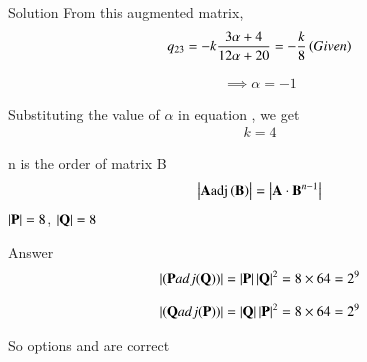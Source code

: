 \documentclass{beamer}
\begin{document}
\begin{frame}{Solution}
From this augmented matrix,
\begin{align}
q_{23} = -k\frac{3\alpha+4}{12\alpha+20} = -\frac{k}{8} \left(Given\right)
\end{align}

\begin{align}
\implies \alpha = -1
\end{align}


Substituting the value of $\alpha$ in equation , we get
\begin{align}
k = 4
\end{align}

n is the order of matrix B
\begin{align}
\left\vert{\mathbf{A}\mathrm{adj}\ensuremath{\left(\mathbf{B}\right)}}\right\vert = \left\vert\mathbf{A}\cdot\mathbf{B}^{n-1}\right\vert
\end{align}
$\left\vert\mathbf{P}\right\vert = 8$, $\left\vert\mathbf{Q}\right\vert = 8$
    
\end{frame}

\begin{frame}{Answer}
\begin{align}
\left\vert{(\mathbf{P} adj(\mathbf{Q}))}\right\vert = \left\vert\mathbf{P}\right\vert \left\vert\mathbf{Q}\right\vert^{2} = 8\times64 = 2^9
\end{align}

\begin{align}
\left\vert{(\mathbf{Q} adj(\mathbf{P}))}\right\vert = \left\vert\mathbf{Q}\right\vert \left\vert\mathbf{P}\right\vert^{2} = 8\times64 = 2^9 
\end{align}

So options  and  are correct    
\end{frame}
\end{document}
